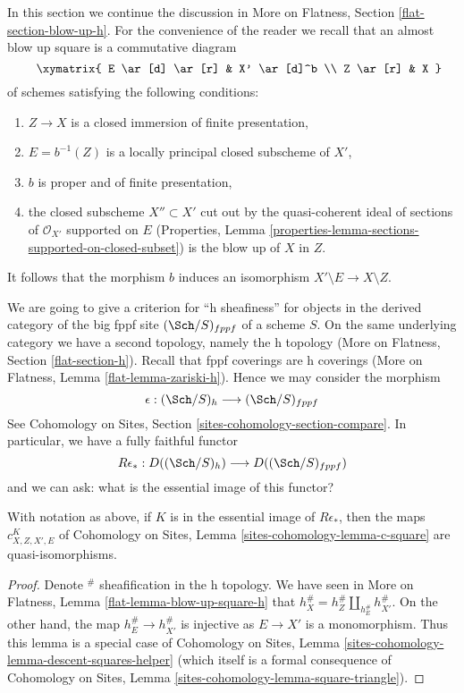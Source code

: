 \noindent
In this section we continue the discussion in
More on Flatness, Section \ref{flat-section-blow-up-h}.
For the convenience of the reader we recall that an
almost blow up square is a commutative diagram
\begin{equation}
\label{equation-almost-blow-up-square}
\vcenter{
\xymatrix{
E \ar[d] \ar[r] & X' \ar[d]^b \\
Z \ar[r] & X
}
}
\end{equation}
of schemes satisfying the following conditions:
\begin{enumerate}
\item $Z \to X$ is a closed immersion of finite presentation,
\item $E = b^{-1}(Z)$ is a locally principal closed subscheme of $X'$,
\item $b$ is proper and of finite presentation,
\item the closed subscheme $X'' \subset X'$ cut out by the quasi-coherent
ideal of sections of $\mathcal{O}_{X'}$ supported on $E$
(Properties, Lemma \ref{properties-lemma-sections-supported-on-closed-subset})
is the blow up of $X$ in $Z$.
\end{enumerate}
It follows that the morphism $b$ induces an isomorphism
$X' \setminus E \to X \setminus Z$.

\medskip\noindent
We are going to give a criterion for ``h sheafiness'' for
objects in the derived category of the big fppf site
$(\Sch/S)_{fppf}$ of a scheme $S$. On the same underlying category
we have a second topology, namely the h topology
(More on Flatness, Section \ref{flat-section-h}).
Recall that fppf coverings are h coverings
(More on Flatness, Lemma \ref{flat-lemma-zariski-h}). Hence we may
consider the morphism
$$
\epsilon : (\Sch/S)_h \longrightarrow (\Sch/S)_{fppf}
$$
See Cohomology on Sites, Section \ref{sites-cohomology-section-compare}.
In particular, we have a fully faithful functor
$$
R\epsilon_* : D((\Sch/S)_h) \longrightarrow D((\Sch/S)_{fppf})
$$
and we can ask: what is the essential image of this functor?

\begin{lemma}
\label{lemma-blow-up-square-h}
With notation as above, if $K$ is in the essential image
of $R\epsilon_*$, then the maps $c^K_{X, Z, X', E}$ of
Cohomology on Sites, Lemma \ref{sites-cohomology-lemma-c-square}
are quasi-isomorphisms.
\end{lemma}

\begin{proof}
Denote ${}^\#$ sheafification in the h topology.
We have seen in More on Flatness, Lemma \ref{flat-lemma-blow-up-square-h}
that $h_X^\# = h_Z^\# \amalg_{h_E^\#} h_{X'}^\#$. On the other hand,
the map $h_E^\# \to h_{X'}^\#$ is injective as $E \to X'$ is a
monomorphism. Thus this lemma is a special case of
Cohomology on Sites, Lemma \ref{sites-cohomology-lemma-descent-squares-helper}
(which itself is a formal consequence of
Cohomology on Sites, Lemma \ref{sites-cohomology-lemma-square-triangle}).
\end{proof}

